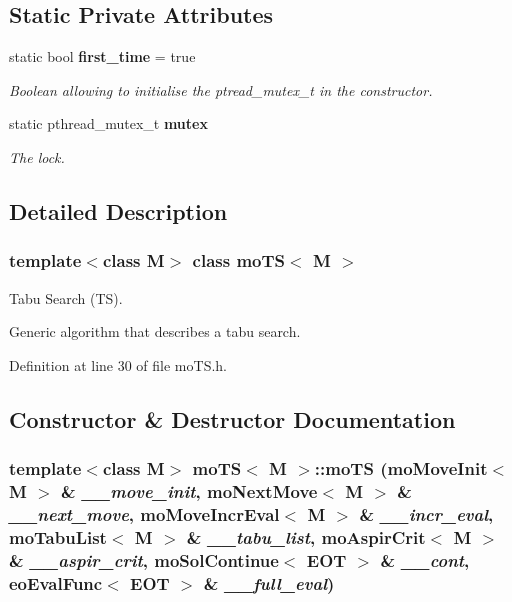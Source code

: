 \subsection*{Static Private Attributes}
\begin{CompactItemize}
\item 
static bool {\bf first\_\-time} = true\label{classmo_t_s_564bc1969548ccbd9bb7e76f92898de0}

\begin{CompactList}\small\item\em Boolean allowing to initialise the ptread\_\-mutex\_\-t in the constructor. \item\end{CompactList}\item 
static pthread\_\-mutex\_\-t {\bf mutex}\label{classmo_t_s_688f9ba42eb33cae6431f4f4eb65b9e9}

\begin{CompactList}\small\item\em The lock. \item\end{CompactList}\end{CompactItemize}


\subsection{Detailed Description}
\subsubsection*{template$<$class M$>$ class mo\-TS$<$ M $>$}

Tabu Search (TS). 

Generic algorithm that describes a tabu search. 



Definition at line 30 of file mo\-TS.h.

\subsection{Constructor \& Destructor Documentation}
\subsubsection{\setlength{\rightskip}{0pt plus 5cm}template$<$class M$>$ {\bf mo\-TS}$<$ M $>$::{\bf mo\-TS} ({\bf mo\-Move\-Init}$<$ M $>$ \& {\em \_\-\_\-move\_\-init}, {\bf mo\-Next\-Move}$<$ M $>$ \& {\em \_\-\_\-next\_\-move}, {\bf mo\-Move\-Incr\-Eval}$<$ M $>$ \& {\em \_\-\_\-incr\_\-eval}, {\bf mo\-Tabu\-List}$<$ M $>$ \& {\em \_\-\_\-tabu\_\-list}, {\bf mo\-Aspir\-Crit}$<$ M $>$ \& {\em \_\-\_\-aspir\_\-crit}, {\bf mo\-Sol\-Continue}$<$ {\bf EOT} $>$ \& {\em \_\-\_\-cont}, eo\-Eval\-Func$<$ {\bf EOT} $>$ \& {\em \_\-\_\-full\_\-eval})\hspace{0.3cm}{\tt  [inline]}}\label{classmo_t_s_2be23f4524733ee6f37b71310d76407e}


